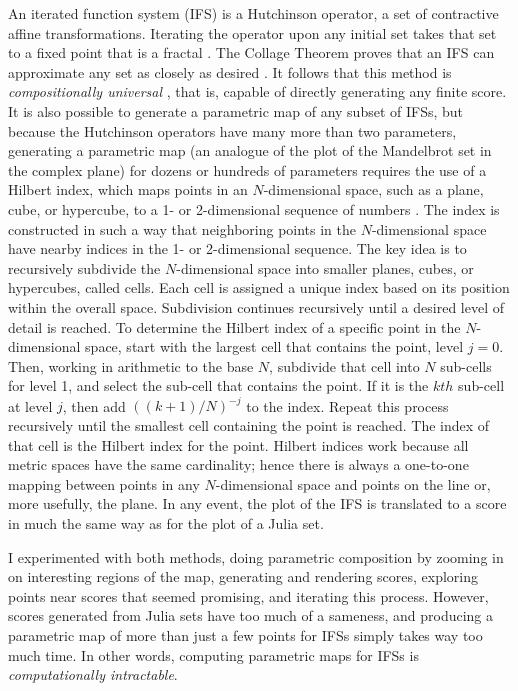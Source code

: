 \documentclass[11pt]{scrartcl}
\begin{document}
An iterated function system (IFS) is a Hutchinson operator, a set of contractive affine transformations. Iterating the operator upon any initial set takes that set to a fixed point that is a fractal \parencite{barnsley1985iterated, barnsley1993}. The Collage Theorem proves that an IFS can approximate any set as closely as desired \parencite{barnsley1989fractal, barnsley1993}. It follows that this method is \emph{compositionally universal} \parencite{obsessed, gogins2023scoregraphs}, that is, capable of directly generating any finite score. It is also possible to generate a parametric map of any subset of IFSs, but because the Hutchinson operators have many more than two parameters, generating a parametric map (an analogue of the plot of the Mandelbrot set in the complex plane) for dozens or hundreds of parameters requires the use of a Hilbert index, which maps points in an $N$-dimensional space, such as a plane, cube, or hypercube, to a 1- or 2-dimensional sequence of numbers \parencite{patrick1968mapping}. The index is constructed in such a way that neighboring points in the $N$-dimensional space have nearby indices in the 1- or 2-dimensional sequence. The key idea is to recursively subdivide the $N$-dimensional space into smaller planes, cubes, or hypercubes, called cells. Each cell is assigned a unique index based on its position within the overall space. Subdivision continues recursively until a desired level of detail is reached. To determine the Hilbert index of a specific point in the $N$-dimensional space, start with the largest cell that contains the point, level $j = 0$. Then, working in arithmetic to the base $N$, subdivide that cell into $N$ sub-cells for level 1, and select the sub-cell that contains the point. If it is the $kth$ sub-cell at level $j$, then add $((k + 1)/N)^{-j}$ to the index. Repeat this process recursively until the smallest cell containing the point is reached. The index of that cell is  the Hilbert index for the point. Hilbert indices work because all metric spaces have the same cardinality; hence there is always a one-to-one mapping between points in any $N$-dimensional space and points on the line or, more usefully, the plane. In any event, the plot of the IFS is translated to a score in much the same way as for the plot of a Julia set.

I experimented with both methods, doing parametric composition by zooming in on interesting regions of the map, generating and rendering scores, exploring points near scores that seemed promising, and iterating this process. However, scores generated from Julia sets have too much of a sameness, and producing a parametric map of more than just a few points for IFSs simply takes way too much time. In other words, computing parametric maps for IFSs is \emph{computationally intractable}. 
\end{document}
